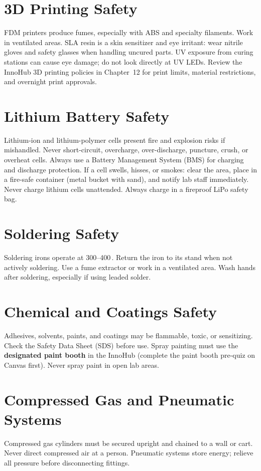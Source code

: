 \section*{3D Printing Safety}
FDM printers produce fumes, especially with ABS and specialty filaments. Work in ventilated areas. SLA resin is a skin sensitizer and eye irritant: wear nitrile gloves and safety glasses when handling uncured parts. UV exposure from curing stations can cause eye damage; do not look directly at UV LEDs. Review the InnoHub 3D printing policies in Chapter~12 for print limits, material restrictions, and overnight print approvals.

\section*{Lithium Battery Safety}
Lithium-ion and lithium-polymer cells present fire and explosion risks if mishandled. Never short-circuit, overcharge, over-discharge, puncture, crush, or overheat cells. Always use a Battery Management System (BMS) for charging and discharge protection. If a cell swells, hisses, or smokes: clear the area, place in a fire-safe container (metal bucket with sand), and notify lab staff immediately. Never charge lithium cells unattended. Always charge in a fireproof LiPo safety bag.

\section*{Soldering Safety}
Soldering irons operate at 300--400\,\degC{}. Return the iron to its stand when not actively soldering. Use a fume extractor or work in a ventilated area. Wash hands after soldering, especially if using leaded solder.

\section*{Chemical and Coatings Safety}
Adhesives, solvents, paints, and coatings may be flammable, toxic, or sensitizing. Check the Safety Data Sheet (SDS) before use. Spray painting must use the \textbf{designated paint booth} in the InnoHub (complete the paint booth pre-quiz on Canvas first). Never spray paint in open lab areas.

\section*{Compressed Gas and Pneumatic Systems}
Compressed gas cylinders must be secured upright and chained to a wall or cart. Never direct compressed air at a person. Pneumatic systems store energy; relieve all pressure before disconnecting fittings.

